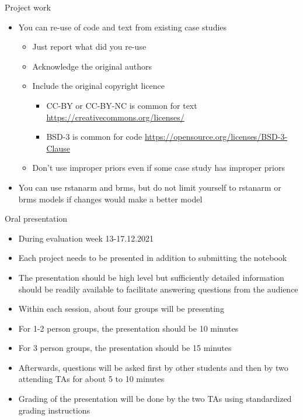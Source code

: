 \documentclass[t]{beamer}
\begin{document}
\begin{frame}
  
  {\Large\color{navyblue} Project work}
  
  \begin{itemize}
  \item You can re-use of code and text from existing case studies
    \begin{itemize}
    \item Just report what did you re-use
    \item Acknowledge the original authors
    \item Include the original copyright licence
      \begin{itemize}
      \item CC-BY or CC-BY-NC is common for text
        \url{https://creativecommons.org/licenses/}
      \item BSD-3 is common for code
        \url{https://opensource.org/licenses/BSD-3-Clause}
      \end{itemize}
    \item Don't use improper priors even if some case study has improper priors
  \end{itemize}
  \item You can use rstanarm and brms, but do not limit yourself
    to rstanarm or brms models if changes would make a better model
  \end{itemize}
\end{frame}

\begin{frame}
  
  {\Large\color{navyblue} Oral presentation}
  
  \begin{itemize}
  \item During evaluation week 13-17.12.2021
  \item Each project needs to be presented in addition to submitting the notebook
  \item The presentation should be high level but sufficiently detailed information should be readily available to facilitate answering questions from the audience
  \item Within each session, about four groups will be presenting
  \item For 1-2 person groups, the presentation should be 10 minutes
  \item For 3 person groups, the presentation should be 15 minutes 
  \item Afterwards, questions will be asked first by other students and then by two attending TAs for about 5 to 10 minutes
  \item Grading of the presentation will be done by the two TAs using standardized grading instructions
  \end{itemize}
\end{frame}
\end{document}

